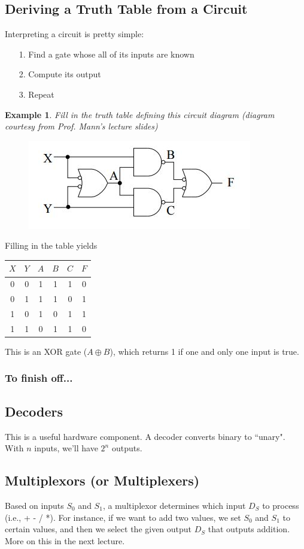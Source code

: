 \documentclass{report}
\newtheorem{ex}{Example}[section]
\begin{document}
\subsection{Deriving a Truth Table from a Circuit}
Interpreting a circuit is pretty simple:
\begin{itemize}
\item[1.] Find a gate whose all of its inputs are known
\item[2.] Compute its output
\item[3.] Repeat
\end{itemize}
\begin{ex}
Fill in the truth table defining this circuit diagram (diagram courtesy from Prof. Mann's lecture slides)
\end{ex}
\begin{figure}[ht]
\begin{center}
\includegraphics[scale=0.5]{circuit_diagram.jpg}
\end{center}
\end{figure}
Filling in the table yields
\begin{center}
\begin{tabular}{ c c | c c c | c}
$X$ & $Y$ & $A$ &$B$ &$C$ & $F$ \\ \hline
0 & 0 & 1 & 1 & 1 & 0\\
0 & 1 & 1 & 1 & 0 & 1\\
1 & 0 & 1 & 0 & 1 & 1\\
1 & 1 & 0 & 1 & 1 & 0\\
\end{tabular}
\end{center}
This is an XOR gate ($A \oplus B$), which returns 1 if one and only one input is true.
\subsubsection{To finish off...}
\subsection{Decoders}
This is a useful hardware component. A decoder converts binary to ``unary". With $n$ inputs, we'll have $2^n$ outputs.
\subsection{Multiplexors (or Multiplexers)}
Based on inputs $S_0$ and $S_1$, a multiplexor determines which input $D_S$ to process (i.e., + - / *). For instance, if we want to add two values, we set $S_0$ and $S_1$ to certain values, and then we select the given output $D_S$ that outputs addition. More on this in the next lecture.
\end{document}
